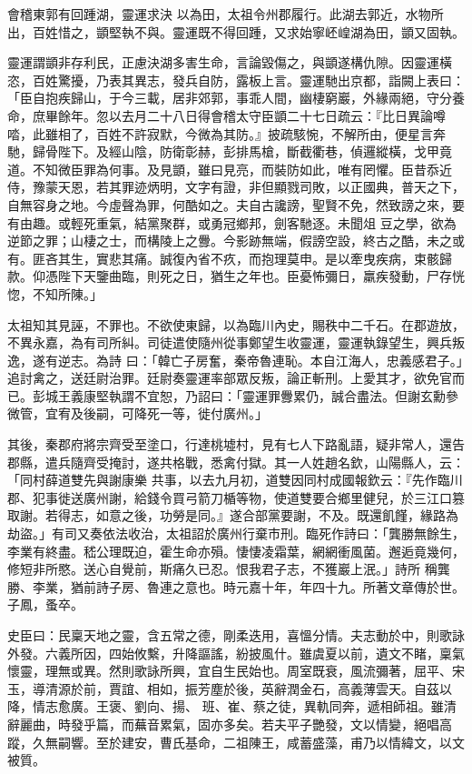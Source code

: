 \begin{pinyinscope}
 會稽東郭有回踵湖，靈運求決
 以為田，太祖令州郡履行。此湖去郭近，水物所出，百姓惜之，顗堅執不與。靈運既不得回踵，又求始寧岯崲湖為田，顗又固執。



 靈運謂顗非存利民，正慮決湖多害生命，言論毀傷之，與顗遂構仇隙。因靈運橫恣，百姓驚擾，乃表其異志，發兵自防，露板上言。靈運馳出京都，詣闕上表曰：「臣自抱疾歸山，于今三載，居非郊郭，事乖人間，幽棲窮巖，外緣兩絕，守分養命，庶畢餘年。忽以去月二十八日得會稽太守臣顗二十七日疏云：『比日異論噂
 𠴲，此雖相了，百姓不許寂默，今微為其防。』披疏駭惋，不解所由，便星言奔馳，歸骨陛下。及經山陰，防衛彰赫，彭排馬槍，斷截衢巷，偵邏縱橫，戈甲竟道。不知微臣罪為何事。及見顗，雖曰見亮，而裝防如此，唯有罔懼。臣昔忝近侍，豫蒙天恩，若其罪迹炳明，文字有證，非但顯戮司敗，以正國典，普天之下，自無容身之地。今虛聲為罪，何酷如之。夫自古讒謗，聖賢不免，然致謗之來，要有由趣。或輕死重氣，結黨聚群，或勇冠鄉邦，劍客馳逐。未聞俎
 豆之學，欲為逆節之罪；山棲之士，而構陵上之釁。今影跡無端，假謗空設，終古之酷，未之或有。匪吝其生，實悲其痛。誠復內省不疚，而抱理莫申。是以牽曳疾病，束骸歸款。仰憑陛下天鑒曲臨，則死之日，猶生之年也。臣憂怖彌日，羸疾發動，尸存恍惚，不知所陳。」



 太祖知其見誣，不罪也。不欲使東歸，以為臨川內史，賜秩中二千石。在郡遊放，不異永嘉，為有司所糾。司徒遣使隨州從事鄭望生收靈運，靈運執錄望生，興兵叛逸，遂有逆志。為詩
 曰：「韓亡子房奮，秦帝魯連恥。本自江海人，忠義感君子。」追討禽之，送廷尉治罪。廷尉奏靈運率部眾反叛，論正斬刑。上愛其才，欲免官而已。彭城王義康堅執謂不宜恕，乃詔曰：「靈運罪釁累仍，誠合盡法。但謝玄勳參微管，宜宥及後嗣，可降死一等，徙付廣州。」



 其後，秦郡府將宗齊受至塗口，行達桃墟村，見有七人下路亂語，疑非常人，還告郡縣，遣兵隨齊受掩討，遂共格戰，悉禽付獄。其一人姓趙名欽，山陽縣人，云：「同村薛道雙先與謝康樂
 共事，以去九月初，道雙因同村成國報欽云：『先作臨川郡、犯事徙送廣州謝，給錢令買弓箭刀楯等物，使道雙要合鄉里健兒，於三江口篡取謝。若得志，如意之後，功勞是同。』遂合部黨要謝，不及。既還飢饉，緣路為劫盜。」有司又奏依法收治，太祖詔於廣州行棄市刑。臨死作詩曰：「龔勝無餘生，李業有終盡。嵇公理既迫，霍生命亦殞。悽悽凌霜葉，網網衝風菌。邂逅竟幾何，修短非所愍。送心自覺前，斯痛久已忍。恨我君子志，不獲巖上泯。」詩所
 稱龔勝、李業，猶前詩子房、魯連之意也。時元嘉十年，年四十九。所著文章傳於世。子鳳，蚤卒。



 史臣曰：民稟天地之靈，含五常之德，剛柔迭用，喜慍分情。夫志動於中，則歌詠外發。六義所因，四始攸繫，升降謳謠，紛披風什。雖虞夏以前，遺文不睹，稟氣懷靈，理無或異。然則歌詠所興，宜自生民始也。周室既衰，風流彌著，屈平、宋玉，導清源於前，賈誼、相如，振芳塵於後，英辭潤金石，高義薄雲天。自茲以降，情志愈廣。王褒、劉向、揚、
 班、崔、蔡之徒，異軌同奔，遞相師祖。雖清辭麗曲，時發乎篇，而蕪音累氣，固亦多矣。若夫平子艷發，文以情變，絕唱高蹤，久無嗣響。至於建安，曹氏基命，二祖陳王，咸蓄盛藻，甫乃以情緯文，以文被質。




\end{pinyinscope}
